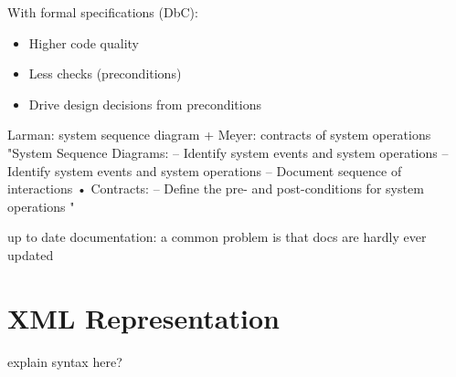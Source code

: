 With formal specifications (\ac{DbC}):
\begin{itemize}
    \item Higher code quality
    \item Less checks (preconditions)
    \item Drive design decisions from preconditions
\end{itemize}


Larman: system sequence diagram + Meyer: contracts of system operations
"System Sequence Diagrams:
–
Identify system events and system operations
–
Identify system events and system operations
– Document sequence of interactions
• Contracts:
– Define the pre- and post-conditions for system
operations "

up to date documentation: a common problem is that docs are hardly ever updated

\section{XML Representation}
explain syntax here?